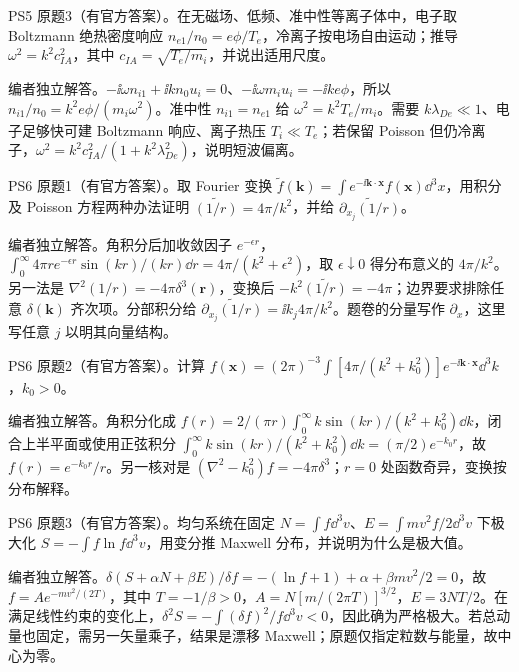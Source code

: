 \begin{exercise}\label{ex:hist02-5-3}
PS5 原题3（有官方答案）。在无磁场、低频、准中性等离子体中，电子取 Boltzmann 绝热密度响应 $n_{e1}/n_0=e\phi/T_e$，冷离子按电场自由运动；推导 $\omega^2=k^2c_{IA}^2$，其中 $c_{IA}=\sqrt{T_e/m_i}$，并说出适用尺度。
\end{exercise}
\begin{solution}
编者独立解答。$-\ii\omega n_{i1}+\ii kn_0u_i=0$、$-\ii\omega m_iu_i=-\ii ke\phi$，所以 $n_{i1}/n_0=k^2e\phi/(m_i\omega^2)$。准中性 $n_{i1}=n_{e1}$ 给 $\omega^2=k^2T_e/m_i$。需要 $k\lambda_{De}\ll1$、电子足够快可建 Boltzmann 响应、离子热压 $T_i\ll T_e$；若保留 Poisson 但仍冷离子，$\omega^2=k^2c_{IA}^2/(1+k^2\lambda_{De}^2)$，说明短波偏离。
\end{solution}

\begin{exercise}\label{ex:hist02-6-1}
PS6 原题1（有官方答案）。取 Fourier 变换 $\widetilde f(\mathbf k)=\int e^{-\ii\mathbf k\cdot\mathbf x}f(\mathbf x)\dd^3x$，用积分及 Poisson 方程两种办法证明 $\widetilde{(1/r)}=4\pi/k^2$，并给 $\widetilde{\partial_{x_j}(1/r)}$。
\end{exercise}
\begin{solution}
编者独立解答。角积分后加收敛因子 $e^{-\epsilon r}$，$\int_0^\infty4\pi r e^{-\epsilon r}\sin(kr)/(kr)\dd r=4\pi/(k^2+\epsilon^2)$，取 $\epsilon\downarrow0$ 得分布意义的 $4\pi/k^2$。另一法是 $\nabla^2(1/r)=-4\pi\delta^3(\mathbf r)$，变换后 $-k^2\widetilde{(1/r)}=-4\pi$；边界要求排除任意 $\delta(\mathbf k)$ 齐次项。分部积分给 $\widetilde{\partial_{x_j}(1/r)}=\ii k_j4\pi/k^2$。题卷的分量写作 $\partial_x$，这里写任意 $j$ 以明其向量结构。
\end{solution}

\begin{exercise}\label{ex:hist02-6-2}
PS6 原题2（有官方答案）。计算 $f(\mathbf x)=(2\pi)^{-3}\int [4\pi/(k^2+k_0^2)]e^{-\ii\mathbf k\cdot\mathbf x}\dd^3k$，$k_0>0$。
\end{exercise}
\begin{solution}
编者独立解答。角积分化成 $f(r)=2/(\pi r)\int_0^\infty k\sin(kr)/(k^2+k_0^2)\dd k$，闭合上半平面或使用正弦积分 $\int_0^\infty k\sin(kr)/(k^2+k_0^2)\dd k=(\pi/2)e^{-k_0r}$，故 $f(r)=e^{-k_0r}/r$。另一核对是 $(\nabla^2-k_0^2)f=-4\pi\delta^3$；$r=0$ 处函数奇异，变换按分布解释。
\end{solution}

\begin{exercise}\label{ex:hist02-6-3}
PS6 原题3（有官方答案）。均匀系统在固定 $N=\int f\dd^3v$、$E=\int mv^2f/2\dd^3v$ 下极大化 $S=-\int f\ln f\dd^3v$，用变分推 Maxwell 分布，并说明为什么是极大值。
\end{exercise}
\begin{solution}
编者独立解答。$\delta(S+\alpha N+\beta E)/\delta f=-(\ln f+1)+\alpha+\beta mv^2/2=0$，故 $f=Ae^{-mv^2/(2T)}$，其中 $T=-1/\beta>0$，$A=N[m/(2\pi T)]^{3/2}$，$E=3NT/2$。在满足线性约束的变化上，$\delta^2S=-\int(\delta f)^2/f\dd^3v<0$，因此确为严格极大。若总动量也固定，需另一矢量乘子，结果是漂移 Maxwell；原题仅指定粒数与能量，故中心为零。
\end{solution}


